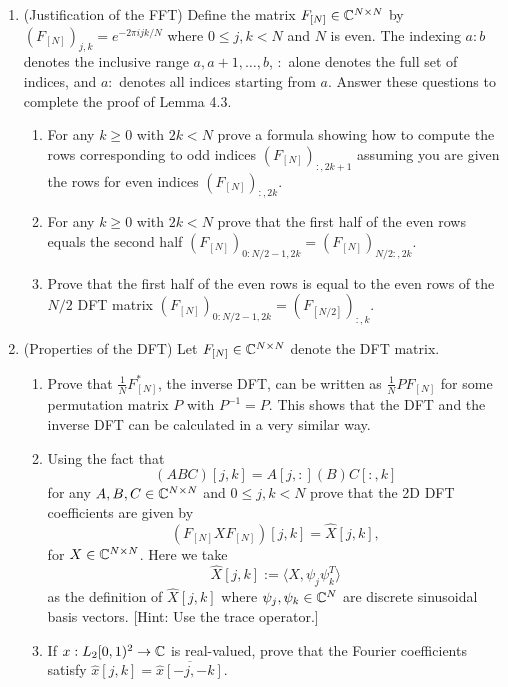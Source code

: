 \documentclass[12pt,twoside]{article}
\begin{document}
\begin{enumerate}
\begin{enumerate}
  \end{enumerate}

\item (Justification of the FFT) Define the matrix
  $F_{[N]}\in\mathbb{C}^{N\times N}$ by
  $(F_{[N]})_{j,k}=e^{-2\pi i jk/N}$ where $0\leq j,k<N$ and $N$ is even.
  The indexing $a:b$ denotes the
  inclusive range $a,a+1,\ldots,b$, $:$ alone denotes the
  full set of indices, and $a:$ denotes all indices starting from $a$. Answer these questions to complete the proof of Lemma 4.3.
  \begin{enumerate}
  \item For any $k\geq 0$ with $2k<N$ prove a formula showing how to
    compute the rows corresponding to odd indices $(F_{[N]})_{:,2k+1}$ assuming you are given the rows for even indices $(F_{[N]})_{:,2k}$.
  \item For any $k\geq 0$ with $2k<N$ prove that the first half of the even rows equals the second half $(F_{[N]})_{0:N/2-1,2k}=(F_{[N]})_{N/2:,2k}$.  
  \item Prove that the first half of the even rows is equal to the even rows of the $N/2$ DFT matrix $(F_{[N]})_{0:N/2-1,2k} = (F_{[N/2]})_{:,k}$.
  \end{enumerate}
 
 \item (Properties of the DFT)
  Let $F_{[N]}\in\mathbb{C}^{N\times N}$ denote the DFT matrix.
  \begin{enumerate}
  \item Prove that $\frac{1}{N}F_{[N]}^*$, the inverse DFT, can be
    written as $\frac{1}{N}PF_{[N]}$ for some permutation matrix $P$
    with $P^{-1}=P$.  This shows that the DFT and the inverse DFT can be
    calculated in a very similar way.
  \item Using the fact that
    $$(ABC)[j,k] = A[j,:](B)C[:,k]$$
    for any $A,B,C\in\mathbb{C}^{N\times N}$ and $0\leq j,k<N$ prove that
    the 2D DFT coefficients are given by
    $$(F_{[N]}XF_{[N]})[j,k] = \hat{X}[j,k],$$
    for $X\in\mathbb{C}^{N\times N}$.  Here we take
    $$\hat{X}[j,k] := \langle X,\psi_j\psi_k^T\rangle$$
    as the definition of $\hat{X}[j,k]$
    where $\psi_j,\psi_k\in\mathbb{C}^N$ are discrete
    sinusoidal basis vectors.
    [Hint: Use the trace operator.]
  \item If $x:L_2[0,1)^2\to\mathbb{C}$ is real-valued, prove that the Fourier
    coefficients satisfy $\hat{x}[j,k]=\overline{\hat{x}[-j,-k]}$.
  \end{enumerate}
  

\end{enumerate}
\end{document}
